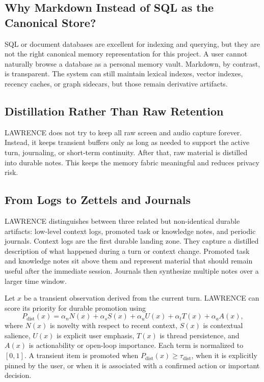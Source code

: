 \documentclass[conference]{IEEEtran}
\begin{document}
\subsection{Why Markdown Instead of SQL as the Canonical Store?}
SQL or document databases are excellent for indexing and querying, but they are not the right canonical memory representation for this project. A user cannot naturally browse a database as a personal memory vault. Markdown, by contrast, is transparent. The system can still maintain lexical indexes, vector indexes, recency caches, or graph sidecars, but those remain derivative artifacts.

\subsection{Distillation Rather Than Raw Retention}
LAWRENCE does not try to keep all raw screen and audio capture forever. Instead, it keeps transient buffers only as long as needed to support the active turn, journaling, or short-term continuity. After that, raw material is distilled into durable notes. This keeps the memory fabric meaningful and reduces privacy risk.

\subsection{From Logs to Zettels and Journals}
LAWRENCE distinguishes between three related but non-identical durable artifacts: low-level context logs, promoted task or knowledge notes, and periodic journals. Context logs are the first durable landing zone. They capture a distilled description of what happened during a turn or context change. Promoted task and knowledge notes sit above them and represent material that should remain useful after the immediate session. Journals then synthesize multiple notes over a larger time window.

Let $x$ be a transient observation derived from the current turn. LAWRENCE can score its priority for durable promotion using
\begin{equation}
\label{eq:distill}
P_{\mathrm{dist}}(x) =
\alpha_n N(x) + \alpha_s S(x) + \alpha_u U(x) + \alpha_t T(x) + \alpha_a A(x),
\end{equation}
where $N(x)$ is novelty with respect to recent context, $S(x)$ is contextual salience, $U(x)$ is explicit user emphasis, $T(x)$ is thread persistence, and $A(x)$ is actionability or open-loop importance. Each term is normalized to $[0,1]$. A transient item is promoted when $P_{\mathrm{dist}}(x) \ge \tau_{\mathrm{dist}}$, when it is explicitly pinned by the user, or when it is associated with a confirmed action or important decision.
\end{document}

